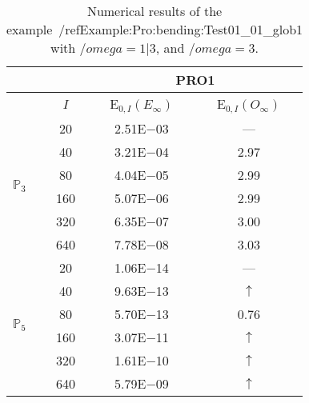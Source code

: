 \begin{table}[H]
\caption{Numerical results of the example~/ref{Example:Pro:bending:Test01_01_glob1} with $/omega=1|3$, and $/omega=3$.}
\setlength{\tabcolsep}{5pt}
\centering
\begin{tabular}{@{}l c c c@{}}
\toprule
 &  & \multicolumn{2}{c}{PRO1}\\
\midrule
 & $I$ & E$_{0,I}(E_{\infty})$ & E$_{0,I}(O_{\infty})$\\
\midrule
\multirow{6}{*}{$\mathbb{P}_{3}$}
 & 20 & 2.51E$-$03 & ---\\
 & 40 & 3.21E$-$04 & 2.97\\
 & 80 & 4.04E$-$05 & 2.99\\
 & 160 & 5.07E$-$06 & 2.99\\
 & 320 & 6.35E$-$07 & 3.00\\
 & 640 & 7.78E$-$08 & 3.03\\
\midrule
\multirow{6}{*}{$\mathbb{P}_{5}$}
 & 20 & 1.06E$-$14 & ---\\
 & 40 & 9.63E$-$13 & $\uparrow$\\
 & 80 & 5.70E$-$13 & 0.76\\
 & 160 & 3.07E$-$11 & $\uparrow$\\
 & 320 & 1.61E$-$10 & $\uparrow$\\
 & 640 & 5.79E$-$09 & $\uparrow$\\
\bottomrule
\end{tabular}
\label{Table:PRO:test_01_01_test11_pro1}
\end{table}
